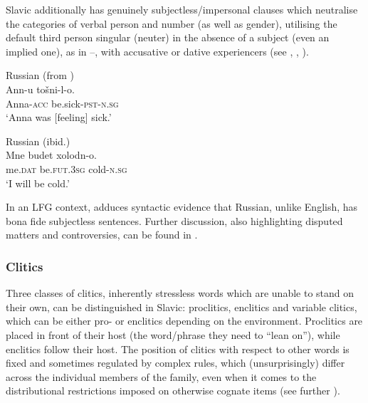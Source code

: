 \documentclass[output=paper,hidelinks]{langscibook}
\begin{document}
Slavic additionally has genuinely subjectless/impersonal clauses which neutralise the categories of verbal person and number (as well as gender), utilising the default third person singular (neuter) in the absence of a subject (even an implied one), as in --, with accusative or dative experiencers (see \citealt[222, 227]{Scatton1993}, \citealt[107--108]{Schenker1993}, \citealt[134--135]{King95}). 

\ea  Russian (from \citealt[18]{King95})\\%
    \label{ex:Slavic:3}
    \gll Ann-u     tošni-l-o.\\
        Anna-\textsc{acc}   be.sick-\textsc{pst}-\textsc{n.sg}\\
    \glt `Anna was [feeling] sick.'
    \z

\ea Russian (ibid.)\\ %
    \label{ex:Slavic:4}
    \gll Mne     budet     xolodn-o.\\
        me.\textsc{dat}   be.\textsc{fut}.\textsc{3sg}   cold-\textsc{n.sg}\\
    \glt `I will be cold.'
    \z

In an LFG context, \citet[19]{dalrymple01} adduces syntactic evidence that Russian, unlike English, has bona fide subjectless sentences. Further discussion, also highlighting disputed matters and controversies, can be found in . 

\subsubsection{Clitics}
\label{sec:Slavic:1.2.5}

Three classes of clitics, inherently stressless words which are unable to stand on their own, can be distinguished in Slavic: proclitics, enclitics and variable clitics, which can be either pro- or enclitics depending on the environment. Proclitics are placed in front of their host (the word/phrase they need to ``lean on''), while enclitics follow their host. The position of clitics with respect to other words is fixed and sometimes regulated by complex rules, which (unsurprisingly) differ across the individual members of the family, even when it comes to the distributional restrictions imposed on otherwise cognate items (see further ). 
\end{document}
